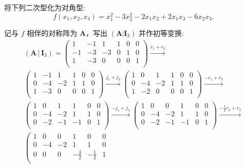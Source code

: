 \documentclass[../../main.tex]{subfiles}
\begin{document}
\begin{example}\label{example:二次型化简-初等变换法例题1}
将下列二次型化为对角型:
\[
f(x_1,x_2,x_3)=x_1^2 - 3x_2^2 - 2x_1x_2 + 2x_1x_3 - 6x_2x_3.
\]
\end{example}
\begin{solution}
记与 $f$ 相伴的对称阵为 $\boldsymbol{A}$，写出 $(\boldsymbol{A}\vdots\boldsymbol{I}_3)$ 并作初等变换:
\begin{gather*}
\left( \boldsymbol{A}\,|\,\boldsymbol{I}_3 \right) =\left( \begin{matrix}
1&		-1&		1&		1&		0&		0\\
-1&		-3&		-3&		0&		1&		0\\
1&		-3&		0&		0&		0&		1\\
\end{matrix} \right) \xrightarrow{r_1+r_2}
\\
\left( \begin{matrix}
1&		-1&		1&		1&		0&		0\\
0&		-4&		-2&		1&		1&		0\\
1&		-3&		0&		0&		0&		1\\
\end{matrix} \right) \xrightarrow{j_1+j_2}\left( \begin{matrix}
1&		0&		1&		1&		0&		0\\
0&		-4&		-2&		1&		1&		0\\
1&		-2&		0&		0&		0&		1\\
\end{matrix} \right) \xrightarrow{-r_1+r_3}
\\
\left( \begin{matrix}
1&		0&		1&		1&		0&		0\\
0&		-4&		-2&		1&		1&		0\\
0&		-2&		-1&		-1&		0&		1\\
\end{matrix} \right) \xrightarrow{-j_1+j_3}\left( \begin{matrix}
1&		0&		0&		1&		0&		0\\
0&		-4&		-2&		1&		1&		0\\
0&		-2&		-1&		-1&		0&		1\\
\end{matrix} \right) \xrightarrow{-\frac{1}{2}r_2+r_3}
\\
\left( \begin{matrix}
1&		0&		0&		1&		0&		0\\
0&		-4&		-2&		1&		1&		0\\
0&		0&		0&		-\frac{3}{2}&		-\frac{1}{2}&		1\\

\end{matrix}
\end{gather*}
\end{solution}
\end{document}
